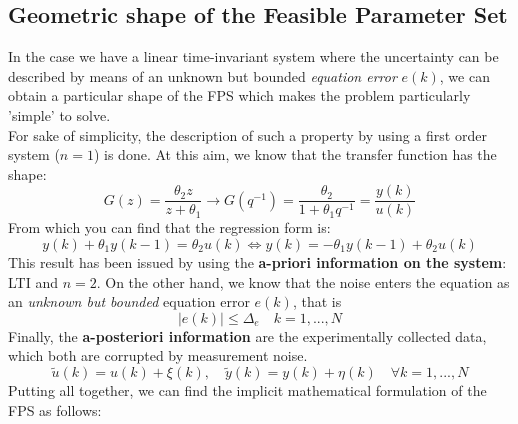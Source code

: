 \subsection{Geometric shape of the Feasible Parameter Set}
In the case we have a linear time-invariant system where the uncertainty can be described by means of an unknown but bounded \textit{equation error} $e(k)$, we can obtain a particular shape of the FPS which makes the problem particularly 'simple' to solve. \\
For sake of simplicity, the description of such a property by using a first order system ($n=1$) is done. At this aim, we know that the transfer function has the shape:
\begin{equation}
    G(z)=\frac{\theta_2{z}}{z+\theta_1} \longrightarrow
    G({q^{-1}}) = \frac{\theta_2}{1+\theta_1{q^{-1}}}=\frac{y(k)}{u(k)}
\end{equation}
From which you can find that the regression form is:
\begin{equation}
    y(k)+\theta_1{y(k-1)}=\theta_2{u(k)} \iff 
    y(k) = -\theta_1{y(k-1)}+\theta_2{u(k)}
\end{equation}
This result has been issued by using the \textbf{a-priori information on the system}: LTI and $n=2$. On the other hand, we know that the noise enters the equation as an \textit{unknown but bounded} equation error $e(k)$, that is
\begin{equation*}
    \vert e(k) \vert \le \Delta_e   \quad k=1,..., N
\end{equation*}
Finally, the \textbf{a-posteriori information} are the experimentally collected data, which both are corrupted by measurement noise. 
\begin{equation*}
    \tilde{u}(k)=u(k)+\xi(k), \quad 
    \tilde{y}(k)=y(k)+\eta(k) \quad \forall k=1, ..., N
\end{equation*}
Putting all together, we can find the implicit mathematical formulation of the FPS as follows:

